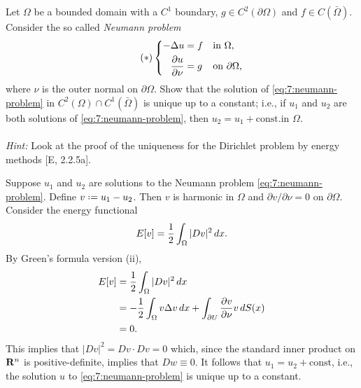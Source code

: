 \begin{problem}
  Let \(\Omega\) be a bounded domain with a \(C^1\) boundary, \(g\in
  C^2(\partial\Omega)\) and \(f\in C(\bar\Omega)\). Consider the so called
  \emph{Neumann problem}
  \[
    \label{eq:7:neumann-problem}%
    \tag{\(*\)}%
    \left\{
      \begin{aligned}
        -\Lap u&=f&&\text{in \(\Omega\),}\\
        \frac{\partial u}{\partial\nu}&=g&&\text{on \(\partial\Omega\),}
      \end{aligned}
    \right.
  \]
  where \(\nu\) is the outer normal on \(\partial\Omega\). Show that the
  solution of \eqref{eq:7:neumann-problem} in
  \(C^2(\Omega)\cap C^1(\bar\Omega)\) is unique up to a constant; i.e., if
  \(u_1\) and \(u_2\) are both solutions of \eqref{eq:7:neumann-problem},
  then \(u_2=u_1+\text{const.}\)\@ in \(\Omega\).
  \\\\
  \emph{Hint:} Look at the proof of the uniqueness for the Dirichlet
  problem by energy methods [E, 2.2.5a].
\end{problem}
\begin{solution*}
  Suppose \(u_1\) and \(u_2\) are solutions to the Neumann problem
  \eqref{eq:7:neumann-problem}. Define \(v\defeq u_1-u_2\). Then \(v\) is
  harmonic in \(\Omega\) and \(\partial v/\partial \nu=0\) on
  \(\partial\Omega\). Consider the energy functional
  \[
    E[v]=\frac{1}{2}\int_\Omega|Dv|^2\mathop{}\!d x.
  \]
  By Green's formula version (ii),
  \begin{align*}
    E[v]
    &=\frac{1}{2}\int_\Omega|Dv|^2\mathop{}\!d x\\
    &=-\frac{1}{2}\int_\Omega v\Delta v\mathop{}\!d x
      +\int_{\partial U}\frac{\partial
      v}{\partial\nu} v\mathop{}\!d S(x)\\
    &=0.
  \end{align*}
  This implies that \(|Dv|^2=Dv\cdot Dv=0\) which, since the standard inner
  product on \(\mathbf{R}^n\) is positive-definite, implies that \(Dw\equiv
  0\). It follows that \(u_1=u_2+\text{const}\), i.e., the solution \(u\)
  to \eqref{eq:7:neumann-problem} is unique up to a constant.
\end{solution*}

